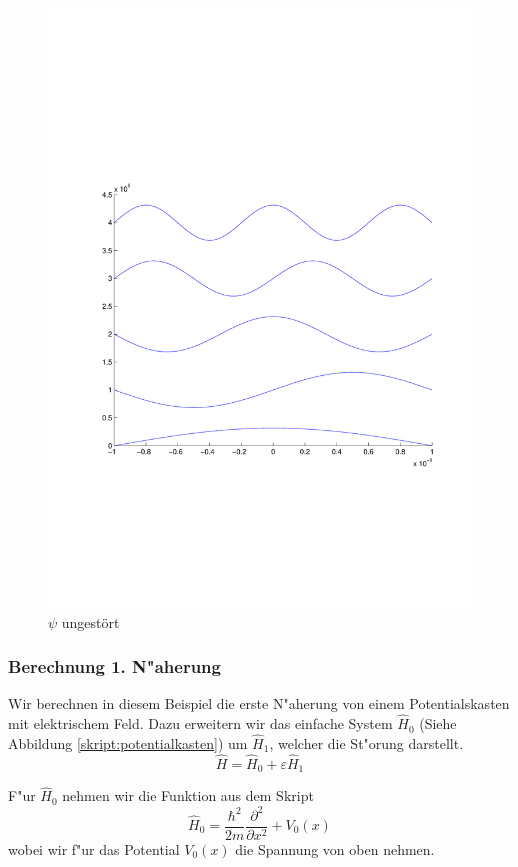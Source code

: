 \begin{refsection}
\begin{figure}
 \centering
 \includegraphics[width=12cm,clip=true,trim=2cm 7cm 1cm 8cm]{efeld/Psi_ungestoert.pdf}
 \caption{$\psi$ ungest\"ort}
 \label{abb:efeld_psi_ungestoert}
\end{figure}








\subsubsection{Berechnung 1. N"aherung}


Wir berechnen in diesem Beispiel die erste N"aherung von einem Potentialskasten mit elektrischem Feld.
Dazu erweitern wir das einfache System  $\hat H_0$
(Siehe Abbildung \ref{skript:potentialkasten})
um $\hat H_1$, welcher die St"orung darstellt.
\[
  \hat{H} = \hat H_0 + \varepsilon \hat H_1
\]

F"ur $\hat H_0$ nehmen wir die Funktion aus dem Skript
\[
  \hat H_0 = \frac{\hbar^2}{2m} \frac{\partial^2}{\partial x^2} + V_0(x)
\]
wobei wir f"ur das Potential $V_0(x)$ die Spannung von oben nehmen.


\end{refsection}
